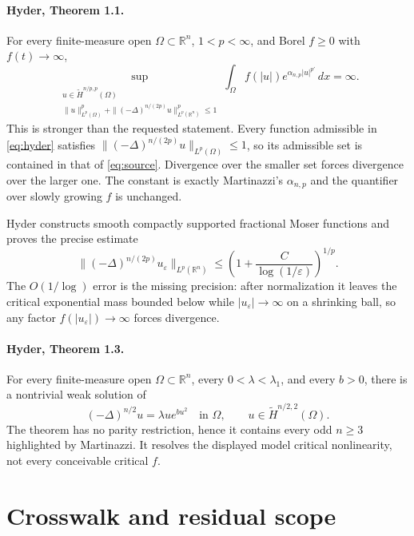 \documentclass[11pt]{article}
\newcommand{\R}{\mathbb R}
\newcommand{\Htilde}{\widetilde H}
\begin{document}
\paragraph{Hyder, Theorem 1.1.}
For every finite-measure open $\Omega\subset\R^n$, $1<p<\infty$, and Borel
$f\ge0$ with $f(t)\to\infty$,
\begin{equation}\label{eq:hyder}
 \sup_{\substack{u\in\Htilde^{n/p,p}(\Omega)\\
 \|u\|_{L^p(\Omega)}^p+
 \|(-\Delta)^{n/(2p)}u\|_{L^p(\R^n)}^p\le1}}
 \int_\Omega f(|u|)e^{\alpha_{n,p}|u|^{p'}}\,dx=\infty.
\end{equation}
This is stronger than the requested statement.  Every function admissible in
\eqref{eq:hyder} satisfies
$\|(-\Delta)^{n/(2p)}u\|_{L^p(\Omega)}\le1$, so its admissible set is contained
in that of \eqref{eq:source}.  Divergence over the smaller set forces
divergence over the larger one.  The constant is exactly Martinazzi's
$\alpha_{n,p}$ and the quantifier over slowly growing $f$ is unchanged.

Hyder constructs smooth compactly supported fractional Moser functions and
proves the precise estimate
\[
 \|(-\Delta)^{n/(2p)}u_\varepsilon\|_{L^p(\R^n)}
 \le \left(1+\frac{C}{\log(1/\varepsilon)}\right)^{1/p}.
\]
The $O(1/\log)$ error is the missing precision: after normalization it leaves
the critical exponential mass bounded below while
$|u_\varepsilon|\to\infty$ on a shrinking ball, so any factor
$f(|u_\varepsilon|)\to\infty$ forces divergence.

\paragraph{Hyder, Theorem 1.3.}
For every finite-measure open $\Omega\subset\R^n$, every
$0<\lambda<\lambda_1$, and every $b>0$, there is a nontrivial weak solution of
\[
 (-\Delta)^{n/2}u=\lambda u e^{bu^2}\quad\text{in }\Omega,
 \qquad u\in\Htilde^{n/2,2}(\Omega).
\]
The theorem has no parity restriction, hence it contains every odd
$n\ge3$ highlighted by Martinazzi.  It resolves the displayed model critical
nonlinearity, not every conceivable critical $f$.

\section{Crosswalk and residual scope}
\end{document}
